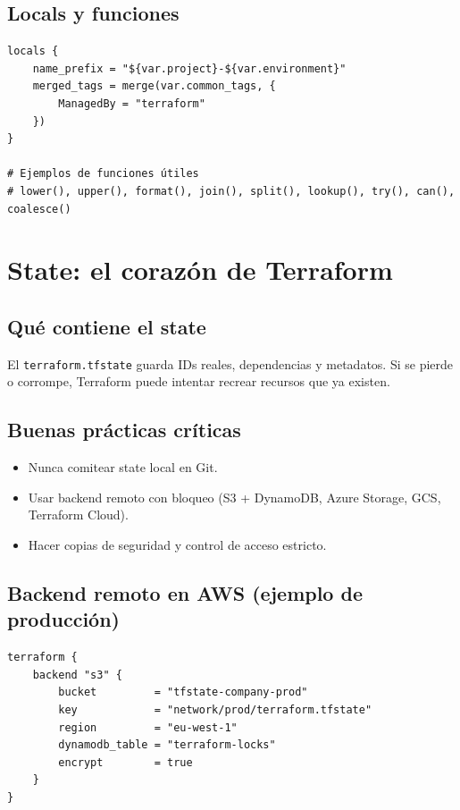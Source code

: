 \documentclass[12pt,a4paper]{article}
\begin{document}
\subsection{Locals y funciones}
\begin{lstlisting}[caption=Locals para evitar duplicación]
locals {
	name_prefix = "${var.project}-${var.environment}"
	merged_tags = merge(var.common_tags, {
		ManagedBy = "terraform"
	})
}

# Ejemplos de funciones útiles
# lower(), upper(), format(), join(), split(), lookup(), try(), can(), coalesce()
\end{lstlisting}

\section{State: el corazón de Terraform}

\subsection{Qué contiene el state}
El \texttt{terraform.tfstate} guarda IDs reales, dependencias y metadatos. Si se pierde o corrompe, Terraform puede intentar recrear recursos que ya existen.

\subsection{Buenas prácticas críticas}
\begin{itemize}
		\item Nunca comitear state local en Git.
		\item Usar backend remoto con bloqueo (S3 + DynamoDB, Azure Storage, GCS, Terraform Cloud).
		\item Hacer copias de seguridad y control de acceso estricto.
\end{itemize}

\subsection{Backend remoto en AWS (ejemplo de producción)}
\begin{lstlisting}[caption=Backend S3 con locking en DynamoDB]
terraform {
	backend "s3" {
		bucket         = "tfstate-company-prod"
		key            = "network/prod/terraform.tfstate"
		region         = "eu-west-1"
		dynamodb_table = "terraform-locks"
		encrypt        = true
	}
}
\end{lstlisting}
\end{document}
